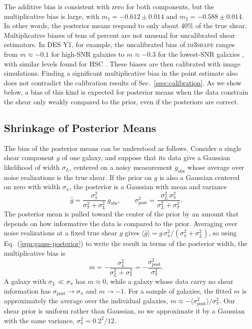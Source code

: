 The additive bias is consistent with zero for both components, but the multiplicative bias is large, with $m_1 = -0.612 \pm 0.014$ and $m_2 = -0.588 \pm 0.014$. In other words, the posterior means respond to only about 40\% of the true shear. Multiplicative biases of tens of percent are not unusual for uncalibrated shear estimators. In DES Y1, for example, the uncalibrated bias of \textsc{im3shape} ranges from $m\approx-0.1$ for high-SNR galaxies to $m\approx-0.3$ for the lowest-SNR galaxies \citep{DESY1Shape}, with similar levels found for HSC \citep{HSCY1Sims}. These biases are then calibrated with image simulations. Finding a significant multiplicative bias in the point estimate also does not contradict the calibration results of Sec.~\ref{ssec:calibration}. As we show below, a bias of this kind is expected for posterior means when the data constrain the shear only weakly compared to the prior, even if the posteriors are correct.

\subsection{Shrinkage of Posterior Means}
\label{app:shrinkage}

The bias of the posterior means can be understood as follows. Consider a single shear component $g$ of one galaxy, and suppose that its data give a Gaussian likelihood of width $\sigma_L$, centered on a noisy measurement $g_\mathrm{obs}$ whose average over noise realizations is the true shear. If the prior on $g$ is also a Gaussian centered on zero with width $\sigma_\pi$, the posterior is a Gaussian with mean and variance
\begin{equation}
\label{eqn:gauss-posterior}
    \hat{g} = \frac{\sigma_\pi^2}{\sigma_\pi^2 + \sigma_L^2}\, g_\mathrm{obs}, \qquad
    \sigma_\mathrm{post}^2 = \frac{\sigma_L^2\, \sigma_\pi^2}{\sigma_L^2 + \sigma_\pi^2}.
\end{equation}
The posterior mean is pulled toward the center of the prior by an amount that depends on how informative the data is compared to the prior. Averaging over noise realizations at a fixed true shear $g$ gives $\langle \hat{g} \rangle = g\,\sigma_\pi^2/(\sigma_\pi^2 + \sigma_L^2)$, so using Eq.~(\ref{eqn:gauss-posterior}) to write the result in terms of the posterior width, the multiplicative bias is
\begin{equation}
\label{eqn:shrinkage}
    m = -\frac{\sigma_L^2}{\sigma_L^2 + \sigma_\pi^2} = -\frac{\sigma_\mathrm{post}^2}{\sigma_\pi^2}.
\end{equation}
A galaxy with $\sigma_L \ll \sigma_\pi$ has $m \approx 0$, while a galaxy whose data carry no shear information has $\sigma_\mathrm{post} \to \sigma_\pi$ and $m \to -1$. For a sample of galaxies, the fitted $m$ is approximately the average over the individual galaxies, $m \approx -\langle \sigma_\mathrm{post}^2 \rangle / \sigma_\pi^2$. Our shear prior is uniform rather than Gaussian, so we approximate it by a Gaussian with the same variance, $\sigma_\pi^2 = 0.2^2/12$.

